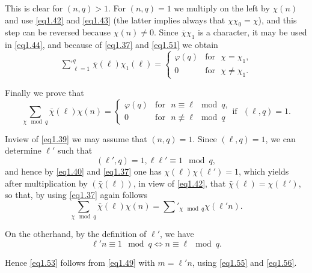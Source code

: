 This is clear for $(n,q)>1$. For  $(n,q)=1$ we multiply on the left by
$\chi(n)$ and use \eqref{eq1.42} and \eqref{eq1.43} (the latter
implies always that 
$\chi\chi_0 =\chi$), and this step can be reversed because $\chi(n)
\neq 0$. Since 
$\overline{\chi}\chi_1$ is a character, it may be used in \eqref{eq1.44}, and
because of \eqref{eq1.37} and \eqref{eq1.51} we obtain  
\begin{equation*}%
\mathop{\sum{}'}^q_{\ell=1} \bar{\chi}(\ell)\chi_1 (\ell) =  
\begin{cases}
\varphi(q) & \text{for~ } \chi=\chi_1,\\
0 & \text{for~ } \chi\neq \chi_1. 
\end{cases}\tag{1.52}\label{eq1.52}
\end{equation*}

Finally we prove that 
\begin{equation*}%
\sum_{\chi \mod q}\bar{\chi}(\ell)\chi (n)= 
\begin{cases}
\varphi (q) & \text{for~ } n \equiv \ell \mod q,\\ 
0 & \text{for~ } n \nequiv \ell \mod q 
\end{cases}\text{if~ } (\ell,q)=1.\tag{1.53}\label{eq1.53}
\end{equation*}

In\pageoriginale view of \eqref{eq1.39} we may assume that $(n,q)=1$. Since
$(\ell,q)=1$, 
we can determine $\ell'$ such that  
\begin{equation*}%
(\ell', q)=1, \ell \ell' \equiv 1 \mod q,\tag{1.54}\label{eq1.54}
\end{equation*}
and hence by \eqref{eq1.40} and \eqref{eq1.37} one has
$\chi(\ell)\chi(\ell')=1$, which 
yields after multiplication by $(\bar{\chi}(\ell))$, in view of
\eqref{eq1.42}, that $\bar{\chi}(\ell)=\chi(\ell')$, so that, by using
\eqref{eq1.37} again follows  
\begin{equation*}%
\sum_{\chi \mod q} \bar{\chi}(\ell)\chi(n) = \sum'_{\chi\mod q}
\chi(\ell'n).\tag{1.55}\label{eq1.55} 
\end{equation*}

On the otherhand, by the definition of $\ell'$, we have 
\begin{equation*}%
\ell'n\equiv 1 \mod q  \Leftrightarrow n \equiv \ell \mod
q. \tag{1.56}\label{eq1.56} 
\end{equation*}

Hence \eqref{eq1.53} follows from \eqref{eq1.49} with $m=\ell'n$,
using \eqref{eq1.55} and \eqref{eq1.56}.  

